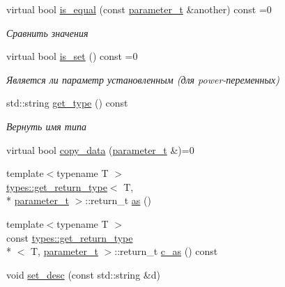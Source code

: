 \begin{DoxyCompactItemize}
virtual bool \hyperlink{classLIBKMS__namespace_1_1Parameter_a2f582483707d9229a5a2bde88d860fff}{is\-\_\-equal} (const \hyperlink{classLIBKMS__namespace_1_1Parameter_af353e23edea754f9a2d1c936cd5c8eab}{parameter\-\_\-t} \&another) const =0
\begin{DoxyCompactList}\small\item\em Сравнить значения \end{DoxyCompactList}\item 
virtual bool \hyperlink{classLIBKMS__namespace_1_1Parameter_ac46dd4bb2e060a4e5f522b625cb44b11}{is\-\_\-set} () const =0
\begin{DoxyCompactList}\small\item\em Является ли параметр установленным (для power-\/переменных) \end{DoxyCompactList}\item 
std\-::string \hyperlink{classLIBKMS__namespace_1_1Parameter_a7d03af2df98ad4053433f84288f0e786}{get\-\_\-type} () const 
\begin{DoxyCompactList}\small\item\em Вернуть имя типа \end{DoxyCompactList}\item 
virtual bool \hyperlink{classLIBKMS__namespace_1_1Parameter_a506fa08096a6595f04341b90912f35a0}{copy\-\_\-data} (\hyperlink{classLIBKMS__namespace_1_1Parameter_af353e23edea754f9a2d1c936cd5c8eab}{parameter\-\_\-t} \&)=0
\item 
{\footnotesize template$<$typename T $>$ }\\\hyperlink{structLIBKMS__namespace_1_1types_1_1get__return__type}{types\-::get\-\_\-return\-\_\-type}$<$ T, \\*
\hyperlink{classLIBKMS__namespace_1_1Parameter_af353e23edea754f9a2d1c936cd5c8eab}{parameter\-\_\-t} $>$\-::return\-\_\-t \hyperlink{classLIBKMS__namespace_1_1Parameter_ae6f38891ce947733703c3de5aafce38c}{as} ()
\item 
{\footnotesize template$<$typename T $>$ }\\const \hyperlink{structLIBKMS__namespace_1_1types_1_1get__return__type}{types\-::get\-\_\-return\-\_\-type}\\*
$<$ T, \hyperlink{classLIBKMS__namespace_1_1Parameter_af353e23edea754f9a2d1c936cd5c8eab}{parameter\-\_\-t} $>$\-::return\-\_\-t \hyperlink{classLIBKMS__namespace_1_1Parameter_a75fd27c3385b7474e99d501e4118702a}{c\-\_\-as} () const 
\item 
void \hyperlink{classLIBKMS__namespace_1_1Parameter_a688e383ed05a421a5b74f3d9a8780fad}{set\-\_\-desc} (const std\-::string \&d)

\end{DoxyCompactItemize}
